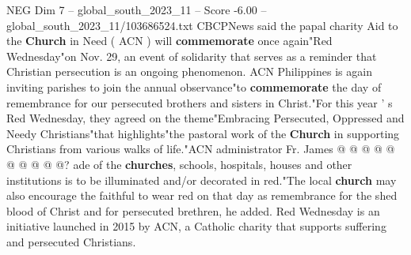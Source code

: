 \begin{textsample}{NEG Dim 7 – global\_south\_2023\_11 – Score -6.00 – global\_south\_2023\_11/103686524.txt}
CBCPNews said the papal charity Aid to the \textbf{Church} in Need ( ACN ) will \textbf{commemorate} once again"Red Wednesday"on Nov. 29, an event of solidarity that serves as a reminder that Christian persecution is an ongoing phenomenon.
ACN Philippines is again inviting parishes to join the annual observance"to \textbf{commemorate} the day of remembrance for our persecuted brothers and sisters in Christ."For this year ' s Red Wednesday, they agreed on the theme"Embracing Persecuted, Oppressed and Needy Christians"that highlights"the pastoral work of the \textbf{Church} in supporting Christians from various walks of life."ACN administrator Fr.
James @ @ @ @ @ @ @ @ @ @? ade of the \textbf{churches}, schools, hospitals, houses and other institutions is to be illuminated and/or decorated in red."The local \textbf{church} may also encourage the faithful to wear red on that day as remembrance for the shed blood of Christ and for persecuted brethren, he added.
Red Wednesday is an initiative launched in 2015 by ACN, a Catholic charity that supports suffering and persecuted Christians.

\end{textsample}
